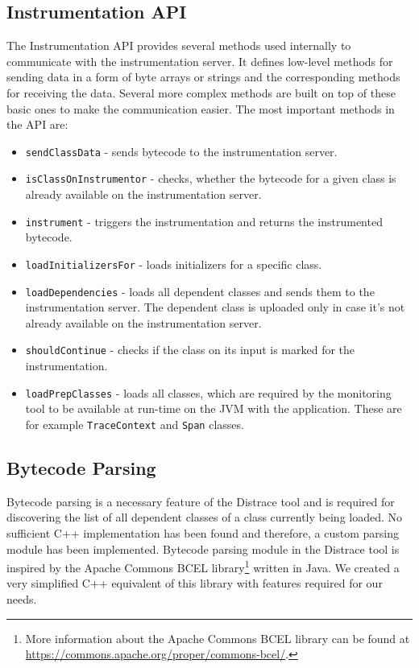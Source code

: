 \subsection{Instrumentation API}
The Instrumentation API provides several methods used internally to communicate with the instrumentation server. It defines low-level methods for sending data in a form of byte arrays or strings and the corresponding methods for receiving the data. Several more complex methods are built on top of these basic ones to make the communication easier. The most important methods in the API are:
\begin{itemize}
	\item \texttt{sendClassData} - sends bytecode to the instrumentation server.
	\item \texttt{isClassOnInstrumentor} - checks, whether the bytecode for a given class is already available on the instrumentation server.
	\item \texttt{instrument} - triggers the instrumentation and returns the instrumented bytecode.
	\item \texttt{loadInitializersFor} - loads initializers for a specific class.
	\item \texttt{loadDependencies} - loads all dependent classes and sends them to the instrumentation server.  The dependent class is uploaded only in case it's not already available on the instrumentation server.
	\item \texttt{shouldContinue} - checks if the class on its input is marked for the instrumentation.
	\item \texttt{loadPrepClasses} - loads all classes, which are required by the monitoring tool to be available at run-time on the JVM with the application. These are for example \texttt{TraceContext} and \texttt{Span} classes.
\end{itemize}

\subsection{Bytecode Parsing}
\label{imp:parsing}
Bytecode parsing is a necessary feature of the Distrace tool and is required for discovering the list of all dependent classes of a class currently being loaded. No sufficient C++ implementation has been found and therefore, a custom parsing module has been implemented. Bytecode parsing module in the Distrace tool is inspired by the Apache Commons BCEL library\footnote{More information about the Apache Commons BCEL library can be found at \url{https://commons.apache.org/proper/commons-bcel/}.} written in Java. We created a very simplified C++ equivalent of this library with features required for our needs.

